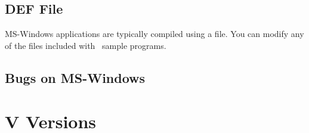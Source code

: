 \subsection* {DEF File}

MS-Windows applications are typically compiled using a  file. You
can modify any of the  files included with \V\ sample programs.

\subsection* {Bugs on MS-Windows}

\section{V Versions}

